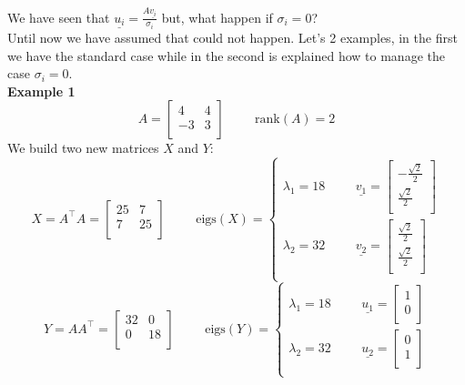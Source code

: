 We have seen that $\underline{u_i} = \frac{A\underline{v_i}}{\sigma_i}$ but, what happen if $\sigma_i = 0$?\\
Until now we have assumed that could not happen. Let's 2 examples, in the first we have the standard case while in the second is explained how to manage the case $\sigma_i = 0$.\\

\textbf{Example 1}
\[
A = \begin{bmatrix}
    4 & 4\\
    -3 & 3\\
\end{bmatrix} \hspace{1cm} \text{rank}(A) = 2
\]
We build two new matrices $X$ and $Y$:
\[
X = A^\intercal A = \begin{bmatrix}
    25 & 7\\
    7 & 25\\
\end{bmatrix} \hspace{1cm} \text{eigs}(X) = 
\begin{cases}
    \lambda_1 = 18 \hspace{1cm} \underline{v_1} = \begin{bmatrix}
        -\frac{\sqrt{2}}{2}\\
        \frac{\sqrt{2}}{2}\\
    \end{bmatrix}\\
    \lambda_2 = 32 \hspace{1cm} \underline{v_2} = \begin{bmatrix}
        \frac{\sqrt{2}}{2}\\
        \frac{\sqrt{2}}{2}\\
    \end{bmatrix}\\
\end{cases}    
\]
\[
Y = AA^\intercal = \begin{bmatrix}
    32 & 0\\
    0 & 18\\
\end{bmatrix} \hspace{1cm} \text{eigs}(Y) =
\begin{cases}
    \lambda_1 = 18 \hspace{1cm} \underline{u_1} = \begin{bmatrix}
        1\\
        0\\
    \end{bmatrix}\\
    \lambda_2 = 32 \hspace{1cm} \underline{u_2} = \begin{bmatrix}
        0\\
        1\\
    \end{bmatrix}\\
\end{cases}    
\]
